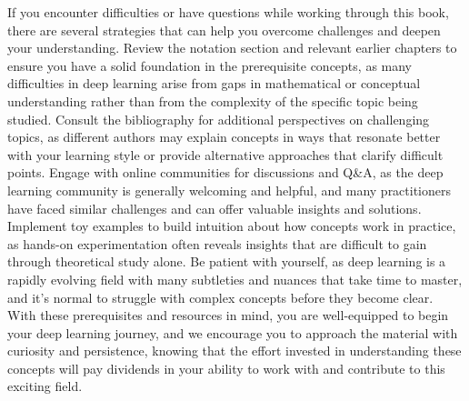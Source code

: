 If you encounter difficulties or have questions while working through this book, there are several strategies that can help you overcome challenges and deepen your understanding. Review the notation section and relevant earlier chapters to ensure you have a solid foundation in the prerequisite concepts, as many difficulties in deep learning arise from gaps in mathematical or conceptual understanding rather than from the complexity of the specific topic being studied. Consult the bibliography for additional perspectives on challenging topics, as different authors may explain concepts in ways that resonate better with your learning style or provide alternative approaches that clarify difficult points. Engage with online communities for discussions and Q\&A, as the deep learning community is generally welcoming and helpful, and many practitioners have faced similar challenges and can offer valuable insights and solutions. Implement toy examples to build intuition about how concepts work in practice, as hands-on experimentation often reveals insights that are difficult to gain through theoretical study alone. Be patient with yourself, as deep learning is a rapidly evolving field with many subtleties and nuances that take time to master, and it's normal to struggle with complex concepts before they become clear. With these prerequisites and resources in mind, you are well-equipped to begin your deep learning journey, and we encourage you to approach the material with curiosity and persistence, knowing that the effort invested in understanding these concepts will pay dividends in your ability to work with and contribute to this exciting field.
